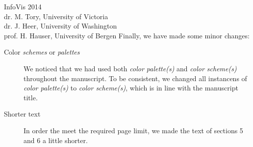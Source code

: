 \documentclass{letter}
\begin{document}
\begin{letter}{InfoVis 2014 \\ dr. M. Tory, University of Victoria \\ dr. J. Heer, University of Washington \\ prof. H. Hauser, University of Bergen}
Finally, we have made some minor changes:
\begin{description}
\item[Color \textit{schemes} or \textit{palettes}] We noticed that we had used both \textit{color palette(s)} and \textit{color scheme(s)} throughout the manuscript. To be consistent, we changed all instancens of \textit{color palette(s)} to \textit{color scheme(s)}, which is in line with the manuscript title.
\item[Shorter text] In order the meet the required page limit, we made the text of sections 5 and 6 a little shorter.
\end{description}








\end{letter}
\end{document}
